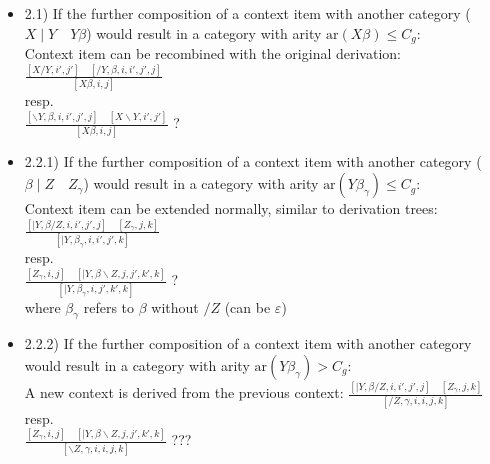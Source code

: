 \begin{itemize}
\begin{itemize}
\begin{itemize}
            \item 2.1) If the further composition of a context item with another category ($X \mid Y \quad Y \beta$) would result in a category with arity $\text{ar}(X \beta) \leq C_g$:\\ 
            Context item can be recombined with the original derivation:
            $
            \frac{[X / Y, i', j'] \quad [/ Y, \beta, i, i', j', j]}{[X \beta, i, j]}
            $\\ 
            resp.\\
            $
            \frac{[\backslash Y, \beta, i, i', j', j] \quad [X \backslash Y, i', j']}{[X \beta, i, j]}
            $ ?
            
            \item 2.2.1) If the further composition of a context item with another category ($\beta \mid Z \quad Z_\gamma$) would result in a category with arity $\text{ar}(Y \beta_\gamma) \leq C_g$:\\ 
            Context item can be extended normally, similar to derivation trees:
            $
            \frac{[\mid Y, \beta / Z, i, i', j', j] \quad [Z_\gamma, j, k]}{[\mid Y, \beta_\gamma, i, i', j', k]}
            $\\
            resp.\\
            $
            \frac{[Z_\gamma, i, j] \quad [\mid Y, \beta \backslash Z, j, j', k', k]}{[\mid Y, \beta_\gamma, i, j', k', k]} 
            $ ? \\
            where $\beta_\gamma$ refers to $\beta$ without $/ Z$ (can be $\varepsilon$)

            \item 2.2.2) If the further composition of a context item with another category would result in a category with arity $\text{ar}(Y \beta_\gamma) > C_g$:\\
            A new context is derived from the previous context:
            $
            \frac{[\mid Y, \beta / Z, i, i', j', j] \quad [Z_\gamma, j, k]}{[/ Z, \gamma, i, i, j, k]}
            $\\
            resp.\\
            $
            \frac{[Z_\gamma, i,j] \quad [\mid Y, \beta \backslash Z, j, j', k', k]}{[\backslash Z, \gamma, i, i, j, k]}
            $ ???
            

\end{itemize}
\end{itemize}
\end{itemize}
